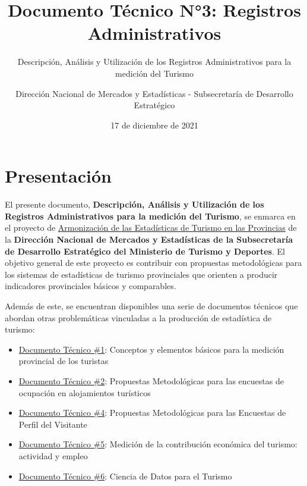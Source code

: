 \documentclass[
]{book}
\title{Documento Técnico N°3: Registros Administrativos}
\subtitle{Descripción, Análisis y Utilización de los Registros Administrativos para la medición del Turismo}
\author{Dirección Nacional de Mercados y Estadísticas - Subsecretaría de Desarrollo Estratégico}
\date{17 de diciembre de 2021}
\let\oldmaketitle\maketitle
\begin{document}
\maketitle


\newpage

\let\maketitle\oldmaketitle
\maketitle

{
\setcounter{tocdepth}{1}
\tableofcontents
}
\hypertarget{presentaciuxf3n}{%
\chapter*{Presentación}\label{presentaciuxf3n}}

El presente documento, \textbf{Descripción, Análisis y Utilización de los Registros Administrativos para la medición del Turismo}, se enmarca en el proyecto de \href{https://armonizacion.yvera.tur.ar//}{Armonización de las Estadísticas de Turismo en las Provincias} de la \textbf{Dirección Nacional de Mercados y Estadísticas de la Subsecretaría de Desarrollo Estratégico del Ministerio de Turismo y Deportes}. El objetivo general de este proyecto es contribuir con propuestas metodológicas para los sistemas de estadísticas de turismo provinciales que orienten a producir indicadores provinciales básicos y comparables.

Además de este, se encuentran disponibles una serie de documentos técnicos que abordan otras problemáticas vinculadas a la producción de estadística de turismo:

\begin{itemize}
\item
  \href{https://dnme-minturdep.github.io/DT1_medicion_turismo/}{Documento Técnico \#1}: Conceptos y elementos básicos para la medición provincial de los turistas
\item
  \href{https://dnme-minturdep.github.io/DT2_encuestas/}{Documento Técnico \#2}: Propuestas Metodológicas para las encuestas de ocupación en alojamientos turísticos
\item
  \href{https://dnme-minturdep.github.io/DT4_perfiles/}{Documento Técnico \#4}: Propuestas Metodológicas para las Encuestas de Perfil del Visitante
\item
  \href{https://dnme-minturdep.github.io/DT5_actividad_empleo/}{Documento Técnico \#5}: Medición de la contribución económica del turismo: actividad y empleo
\item
  \href{https://dnme-minturdep.github.io/DT6_ciencia_de_datos_turismo/}{Documento Técnico \#6}: Ciencia de Datos para el Turismo
\end{itemize}
\end{document}
